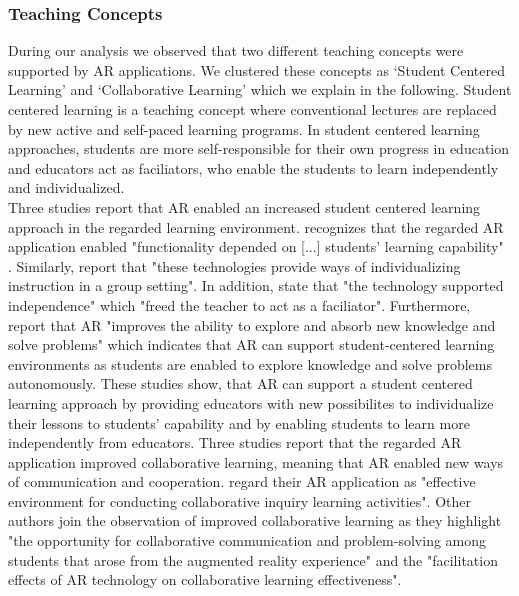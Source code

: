 % 
\subsubsection{Teaching Concepts}
During our analysis we observed that two different teaching concepts were supported by AR applications. We clustered these concepts as ‘Student Centered Learning’ and ‘Collaborative Learning’ which we explain in the following.
Student centered learning is a teaching concept where conventional lectures are replaced by new active and self-paced learning programs. In student centered learning approaches, students are more self-responsible for their own progress in education and educators act as faciliators, who enable the students to learn independently and individualized.\\
Three studies report that AR enabled an increased student centered learning approach in the regarded learning environment. \cite{VateULan.2012} recognizes that the regarded AR application enabled "functionality depended on [...] students’ learning capability" \autocite [894]{VateULan.2012}. Similarly, \cite{Kamarainen.2013} report that "these technologies provide ways of individualizing instruction in a group setting".\autocite[\label{fn:Kamarainen_2013_554}p. 554]{Kamarainen.2013} In addition, \cite{Kamarainen.2013} state that "the technology supported independence" which "freed the teacher to act as a faciliator". Furthermore, \cite{Liu.2009b} report that AR "improves the ability to explore and absorb new knowledge and solve problems" \autocite[173]{Liu.2009b} which indicates that AR can support student-centered learning environments as students are enabled to explore knowledge and solve problems autonomously. These studies show, that AR can support a student centered learning approach by providing educators with new possibilites to individualize their lessons to students' capability and by enabling students to learn more independently from educators.
Three studies report that the regarded AR application improved collaborative learning, meaning that AR enabled new ways of communication and cooperation. \cite{Wang.2012} regard their AR application as "effective environment for conducting collaborative inquiry learning activities". \autocite[57]{Wang.2012} Other authors join the observation of improved collaborative learning as they highlight "the opportunity for collaborative communication and problem-solving among students that arose from the augmented reality experience" \autocite[552]{Kamarainen.2013} and the "facilitation effects of AR technology on collaborative learning effectiveness".\autocite[322]{Li.2011}
% 
